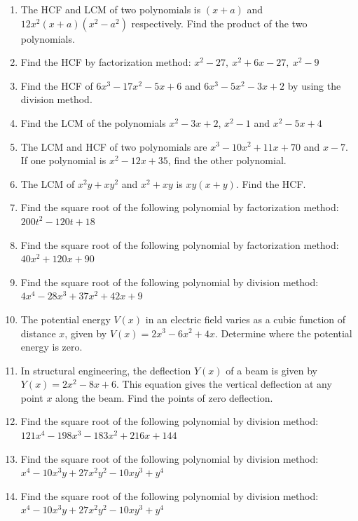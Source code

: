 \documentclass[11pt]{article}
\begin{document}
\begin{enumerate}[leftmargin=1.8cm,start=99]
\item The HCF and LCM of two polynomials is $(x+a)$ and $12x^2(x+a)(x^2-a^2)$ respectively. Find the product of the two polynomials.

\item Find the HCF by factorization method: $x^2-27,\ x^2+6x-27,\ x^2-9$

\item Find the HCF of $6x^3-17x^2-5x+6$ and $6x^3-5x^2-3x+2$ by using the division method.

\item Find the LCM of the polynomials $x^2-3x+2$, $x^2-1$ and $x^2-5x+4$

\item The LCM and HCF of two polynomials are $x^3-10x^2+11x+70$ and $x-7$. If one polynomial is $x^2-12x+35$, find the other polynomial.

\item The LCM of $x^2y+xy^2$ and $x^2+xy$ is $xy(x+y)$. Find the HCF.

\item Find the square root of the following polynomial by factorization method: $200t^2-120t+18$

\item Find the square root of the following polynomial by factorization method: $40x^2+120x+90$

\item Find the square root of the following polynomial by division method: $4x^4-28x^3+37x^2+42x+9$

\item The potential energy $V(x)$ in an electric field varies as a cubic function of distance $x$, given by $V(x)=2x^3-6x^2+4x$. Determine where the potential energy is zero.

\item In structural engineering, the deflection $Y(x)$ of a beam is given by $Y(x)=2x^2-8x+6$. This equation gives the vertical deflection at any point $x$ along the beam. Find the points of zero deflection.

\item Find the square root of the following polynomial by division method: $121x^4-198x^3-183x^2+216x+144$

\item Find the square root of the following polynomial by division method: $x^4-10x^3y+27x^2y^2-10xy^3+y^4$

\item Find the square root of the following polynomial by division method: $x^4-10x^3y+27x^2y^2-10xy^3+y^4$


\end{enumerate}
\end{document}
